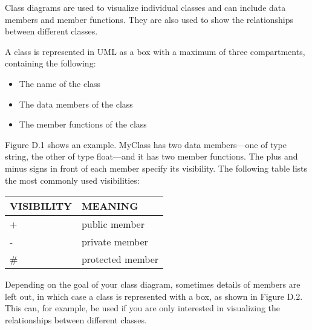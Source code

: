 Class diagrams are used to visualize individual classes and can include data members and member functions. They are also used to show the relationships between different classes.


A class is represented in UML as a box with a maximum of three compartments, containing the following:

\begin{itemize}
\item
The name of the class

\item
The data members of the class

\item
The member functions of the class
\end{itemize}

Figure D.1 shows an example. MyClass has two data members—one of type string, the other of type float—and it has two member functions. The plus and minus signs in front of each member specify its visibility. The following table lists the most commonly used visibilities:


\begin{longtable}{|l|l|}
\hline
\textbf{VISIBILITY} & \textbf{MEANING} \\ \hline
\endfirsthead
%
\endhead
%
+                   & public member    \\ \hline
-                   & private member   \\ \hline
\#                  & protected member \\ \hline
\end{longtable}

Depending on the goal of your class diagram, sometimes details of members are left out, in which case a class is represented with a box, as shown in Figure D.2. This can, for example, be used if you are only interested in visualizing the relationships between different classes.



